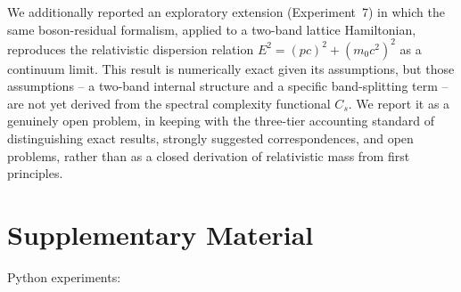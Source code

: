 \documentclass[11pt]{article}
\begin{document}
We additionally reported an exploratory extension (Experiment~7) in which
the same boson-residual formalism, applied to a two-band lattice Hamiltonian,
reproduces the relativistic dispersion relation $E^2=(pc)^2+(m_0c^2)^2$ as a
continuum limit. This result is numerically exact given its assumptions, but
those assumptions -- a two-band internal structure and a specific
band-splitting term -- are not yet derived from the spectral complexity
functional $C_s$. We report it as a genuinely open problem, in keeping with
the three-tier accounting standard of distinguishing exact results, strongly
suggested correspondences, and open problems, rather than as a closed
derivation of relativistic mass from first principles.

\section*{Supplementary Material}
\label{sec:supplementary}

Python experiments:
\end{document}
